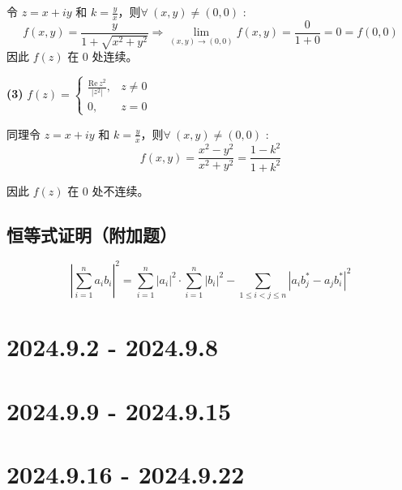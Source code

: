 \documentclass[UTF8]{report}
\def\Re{\mathrm{Re\,}}
\theoremstyle{MyLineTheoremStyle} %
\theoremstyle{MyBlockTheoremStyle} %
\theoremstyle{MySubsubsectionStyle} %
\begin{document}
令 $z = x + iy$ 和 $k = \frac{y}{x}$，则$\forall\ (x,y) \ne (0,0)$ :
\begin{equation*}
    f(x,y) = \frac{y}{1+\sqrt{x^2+y^2}} \Longrightarrow \lim_{(x,y) \to (0,0)} f(x,y) = \frac{0}{1+0} = 0 = f(0,0) 
\end{equation*}
因此 $f(z)$ 在 0 处连续。

\noindent\textbf{(3)} $f(z) = \begin{cases}
    \frac{\Re z^2}{| z^2 |}, & z \neq 0 \\ 
    0, & z = 0
\end{cases}$

同理令 $z = x + iy$ 和 $k = \frac{y}{x}$，则$\forall\ (x,y) \ne (0,0)$ :
\begin{equation*}
f(x,y) = \frac{x^2 - y^2}{ x^2 + y^2 } = \frac{1-k^2}{1+k^2} 
\end{equation*}

因此 $f(z)$ 在 0 处不连续。

\section{恒等式证明（附加题）}

\begin{equation*}
\left| \sum_{i=1}^{n} a_ib_i \right| ^2 
= \sum_{i=1}^{n} | a_i |^2 \cdot \sum_{i=1}^{n} | b_i |^2 - \sum_{1 \leqslant i <j \leqslant n} \left|  a_ib_j^* - a_jb_i^*  \right|^2  
\end{equation*}



\chapter{2024.9.2 - 2024.9.8}\thispagestyle{fancy}










\chapter{2024.9.9 - 2024.9.15}\thispagestyle{fancy}








\chapter{2024.9.16 - 2024.9.22}\thispagestyle{fancy}
\end{document}
